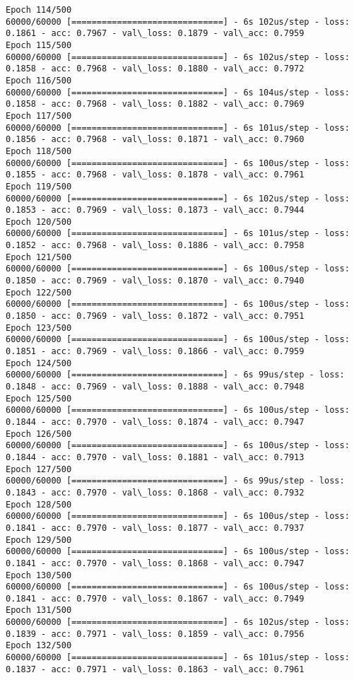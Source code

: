 \documentclass[11pt]{article}
\begin{document}
\begin{Verbatim}[commandchars=\\\{\}]
Epoch 114/500
60000/60000 [==============================] - 6s 102us/step - loss: 0.1861 - acc: 0.7967 - val\_loss: 0.1879 - val\_acc: 0.7959
Epoch 115/500
60000/60000 [==============================] - 6s 102us/step - loss: 0.1858 - acc: 0.7968 - val\_loss: 0.1880 - val\_acc: 0.7972
Epoch 116/500
60000/60000 [==============================] - 6s 104us/step - loss: 0.1858 - acc: 0.7968 - val\_loss: 0.1882 - val\_acc: 0.7969
Epoch 117/500
60000/60000 [==============================] - 6s 101us/step - loss: 0.1856 - acc: 0.7968 - val\_loss: 0.1871 - val\_acc: 0.7960
Epoch 118/500
60000/60000 [==============================] - 6s 100us/step - loss: 0.1855 - acc: 0.7968 - val\_loss: 0.1878 - val\_acc: 0.7961
Epoch 119/500
60000/60000 [==============================] - 6s 102us/step - loss: 0.1853 - acc: 0.7969 - val\_loss: 0.1873 - val\_acc: 0.7944
Epoch 120/500
60000/60000 [==============================] - 6s 101us/step - loss: 0.1852 - acc: 0.7968 - val\_loss: 0.1886 - val\_acc: 0.7958
Epoch 121/500
60000/60000 [==============================] - 6s 100us/step - loss: 0.1850 - acc: 0.7969 - val\_loss: 0.1870 - val\_acc: 0.7940
Epoch 122/500
60000/60000 [==============================] - 6s 100us/step - loss: 0.1850 - acc: 0.7969 - val\_loss: 0.1872 - val\_acc: 0.7951
Epoch 123/500
60000/60000 [==============================] - 6s 100us/step - loss: 0.1851 - acc: 0.7969 - val\_loss: 0.1866 - val\_acc: 0.7959
Epoch 124/500
60000/60000 [==============================] - 6s 99us/step - loss: 0.1848 - acc: 0.7969 - val\_loss: 0.1888 - val\_acc: 0.7948
Epoch 125/500
60000/60000 [==============================] - 6s 100us/step - loss: 0.1844 - acc: 0.7970 - val\_loss: 0.1874 - val\_acc: 0.7947
Epoch 126/500
60000/60000 [==============================] - 6s 100us/step - loss: 0.1844 - acc: 0.7970 - val\_loss: 0.1881 - val\_acc: 0.7913
Epoch 127/500
60000/60000 [==============================] - 6s 99us/step - loss: 0.1843 - acc: 0.7970 - val\_loss: 0.1868 - val\_acc: 0.7932
Epoch 128/500
60000/60000 [==============================] - 6s 100us/step - loss: 0.1841 - acc: 0.7970 - val\_loss: 0.1877 - val\_acc: 0.7937
Epoch 129/500
60000/60000 [==============================] - 6s 100us/step - loss: 0.1841 - acc: 0.7970 - val\_loss: 0.1868 - val\_acc: 0.7947
Epoch 130/500
60000/60000 [==============================] - 6s 100us/step - loss: 0.1841 - acc: 0.7970 - val\_loss: 0.1867 - val\_acc: 0.7949
Epoch 131/500
60000/60000 [==============================] - 6s 102us/step - loss: 0.1839 - acc: 0.7971 - val\_loss: 0.1859 - val\_acc: 0.7956
Epoch 132/500
60000/60000 [==============================] - 6s 101us/step - loss: 0.1837 - acc: 0.7971 - val\_loss: 0.1863 - val\_acc: 0.7961

\end{Verbatim}
\end{document}
